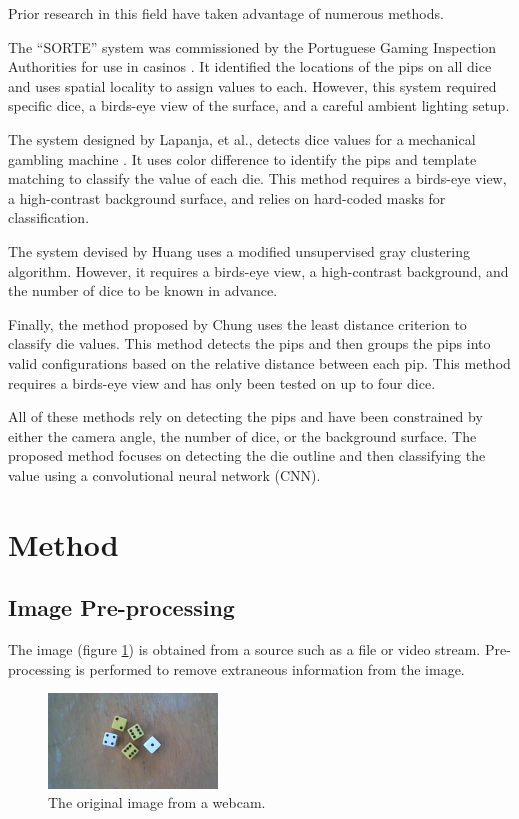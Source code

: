 \documentclass[conference]{IEEEtran}
\begin{document}

Prior research in this field have taken advantage of numerous methods.

The ``SORTE'' system was commissioned by the Portuguese Gaming Inspection Authorities for use in casinos \cite{Correia1995}.
It identified the locations of the pips on all dice and uses spatial locality to assign values to each.
However, this system required specific dice, a birds-eye view of the surface, and a careful ambient lighting setup.

The system designed by Lapanja, et al., detects dice values for a mechanical gambling machine \cite{Lapanjaa}.
It uses color difference to identify the pips and template matching to classify the value of each die.
This method requires a birds-eye view, a high-contrast background surface, and relies on hard-coded masks for classification.

The system devised by Huang \cite{Huang2008} uses a modified unsupervised gray clustering algorithm. 
However, it requires a birds-eye view, a high-contrast background, and the number of dice to be known in advance.

Finally, the method proposed by Chung \cite{Chung2009} uses the least distance criterion to classify die values.
This method detects the pips and then groups the pips into valid configurations based on the relative distance between each pip.
This method requires a birds-eye view and has only been tested on up to four dice.

All of these methods rely on detecting the pips and have been constrained by either the camera angle, the number of dice, or the background surface.
The proposed method focuses on detecting the die outline and then classifying the value using a convolutional neural network (CNN).

\section{Method}

\subsection{Image Pre-processing}

The image (figure \ref{fig:original}) is obtained from a source such as a file or video stream.
Pre-processing is performed to remove extraneous information from the image.
\begin{figure}
	\centering
	\includegraphics[width=0.4\textwidth]{original}
	\caption{The original image from a webcam.}
	\label{fig:original}
\end{figure}
\end{document}
